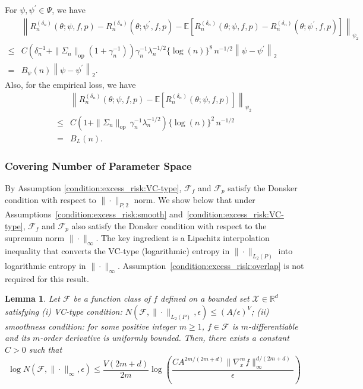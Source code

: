 \documentclass[12pt]{article}
\newtheorem{lemma}{Lemma}%
\newcommand{\E}{\mathbb{E}}
\newcommand{\R}{\mathbb{R}}
\begin{document}
For $\psi,\psi^\prime\in\Psi$, we have 
\begin{align}
&\left\|R_n^{(\delta_n)}(\theta;\psi,f,p)-R_n^{({\delta_n})}(\theta;\psi^\prime,f,p)-\E\left[R_n^{(\delta_n)}(\theta;\psi,f,p)-R_n^{({\delta_n})}(\theta;\psi^\prime,f,p)\right]\right\|_{\psi_2}\nonumber\\
    \leq & C\left(\delta_n^{-1}+\|\Sigma_n\|_{\mathrm{op}}(1+\gamma_n^{-1})\right)\gamma_n^{-1}\lambda_n^{-1/2}\{\log(n)\}^{8}\,n^{-1/2}\left\|\psi-\psi^\prime\right\|_2\nonumber\\
    = & B_\psi(n)\left\|\psi-\psi^\prime\right\|_2. \label{eq:sub_gaussian_psi} 
\end{align}
Also, for the empirical loss, we have 
\begin{align}
    &\left\|R_n^{(\delta_n)}(\theta;\psi,f,p)-\E\left[R_n^{(\delta_n)}(\theta;\psi,f,p)\right]\right\|_{\psi_2}\nonumber\\
    \leq &C\left(1+\|\Sigma_n\|_{\mathrm{op}}\,\gamma_n^{-1}\lambda_n^{-1/2}\right)\{\log(n)\}^2\,n^{-1/2}\nonumber\\
    =& B_L(n).\label{eq:sub_gaussian_L}
\end{align}

\subsubsection{Covering Number of Parameter Space}

\noindent By Assumption \ref{condition:excess_risk:VC-type}, $\mathcal{F}_f$ and $\mathcal{F}_p$ satisfy the Donsker condition with respect to $\|\cdot\|_{P,2}$ norm. We show below that under Assumptions~\ref{condition:excess_risk:smooth} and~\ref{condition:excess_risk:VC-type}, $\mathcal{F}_f$ and $\mathcal{F}_p$ also satisfy the Donsker condition with respect to the supremum norm $\|\cdot\|_\infty$. The key ingredient is a Lipschitz interpolation inequality that converts the VC-type (logarithmic) entropy in $\|\cdot\|_{L_2(P)}$ into logarithmic entropy in $\|\cdot\|_\infty$. Assumption~\ref{condition:excess_risk:overlap} is not required for this result.

\begin{lemma}\label{lemma:covering_number_Linfty_universal}
    Let $\mathcal{F}$ be a function class of $f$ defined on a bounded set $\mathcal{X}\in\R^d$ satisfying (i) VC-type condition: $N(\mathcal{F},\|\cdot\|_{L_2(P)},\epsilon)\leq (A/\epsilon)^V$; (ii) smoothness condition: for some positive integer $m\geq 1$,  $f\in\mathcal{F}$ is $m$-differentiable and its $m$-order derivative is uniformly bounded. Then, there exists a constant $C>0$ such that
    $$\log N(\mathcal{F},\|\cdot\|_\infty,\epsilon)\leq \frac{V(2m+d)}{2m}\log\left(\frac{C A^{2m/(2m+d)}\|\nabla_x^m f\|_{\infty}^{d/(2m+d)}}{\epsilon}\right)$$
\end{lemma}
\end{document}
